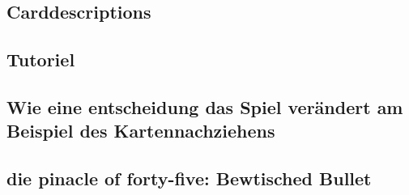 

\subsection{Carddescriptions}\label{subsec:placementMatters}

\subsection{Tutoriel}\label{subsec:placementMatters}



%


\subsection{Wie eine entscheidung das Spiel verändert am Beispiel des Kartennachziehens}\label{subsec:placementMatters}




\subsection{die pinacle of forty-five: Bewtisched Bullet}\label{subsec:placementMatters}


\renewcommand{\kapitelautor}{}

